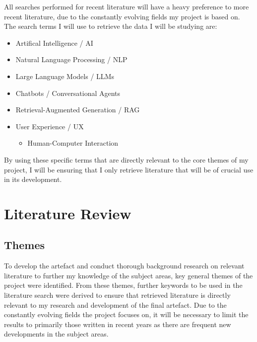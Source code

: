 \documentclass[12pt]{report}
\begin{document}
    \noindent 
    All searches performed for recent literature will have a heavy preference 
    to more recent literature, due to the constantly evolving fields my project is based on. 
    The search terms I will use to retrieve the data I will be studying are:

    \begin{itemize}
        \item Artifical Intelligence / AI 
        \item Natural Language Processing / NLP
        \item Large Language Models / LLMs
        \item Chatbots / Conversational Agents
        \item Retrieval-Augmented Generation / RAG
        
        
        \item User Experience / UX
        \begin{itemize}
            \item Human-Computer Interaction
        \end{itemize}
    \end{itemize}

    \noindent
    By using these specific terms that are directly relevant to the core themes of my project,
    I will be ensuring that I only retrieve literature that will be of crucial use in its 
    development.


    \chapter{Literature Review}

    \section{Themes}

    To develop the artefact and conduct thorough background research on relevant literature to further my 
    knowledge of the subject areas, key general themes of the project were identified. From these themes, further 
    keywords to be used in the literature search were derived to ensure that retrieved literature is directly relevant 
    to my research and development of the final artefact. Due to the constantly evolving fields the project focuses 
    on, it will be necessary to limit the results to primarily those written in recent years as there are 
    frequent new developments in the subject areas.
\end{document}
